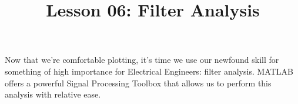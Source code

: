 \documentclass{article}
\title{Lesson 06: Filter Analysis}
\begin{document}
\renderTitle

Now that we're comfortable plotting, it's time we use our newfound skill
for something of high importance for Electrical Engineers: filter
analysis.  MATLAB offers a powerful Signal Processing Toolbox that allows us to
perform this analysis with relative ease.
\end{document}
